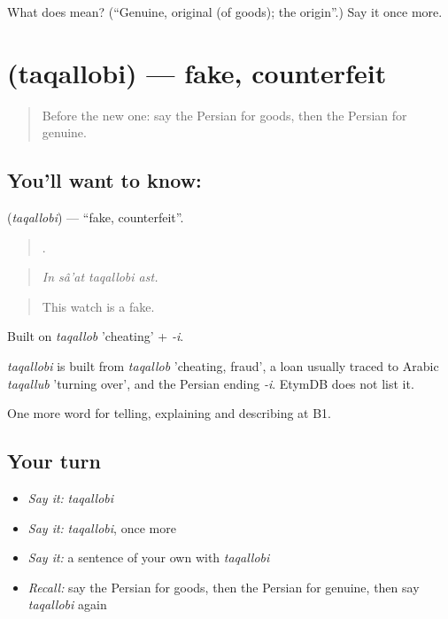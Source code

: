 \begin{tcolorbox}[breakable,colback=teal!4,colframe=teal!35!black,title={Before you move on}]
What does  mean? (\textquotedblleft{}Genuine, original (of goods); the origin\textquotedblright{}.) Say it once more.
\end{tcolorbox}
\section[\texorpdfstring{\fa{تقلبی} (taqallobi)}{تقلبی (taqallobi)}]{ (taqallobi) — fake, counterfeit}

\label{lesson:FA-C459-taqallobi}



\begin{quote}
Before the new one: say the Persian for goods, then the Persian for genuine.
\end{quote}

\subsection*{You'll want to know: }
\textbf{} (\emph{taqallobi}) — \textquotedblleft{}fake, counterfeit\textquotedblright{}.

\begin{quote}
   .
\end{quote}

\begin{quote}
\emph{In sâ'at taqallobi ast.}
\end{quote}

\begin{quote}
This watch is a fake.
\end{quote}

Built on \emph{taqallob} 'cheating' + \emph{-i}.

\begin{cousinweb}
\emph{taqallobi} is built from \emph{taqallob} 'cheating, fraud', a loan usually traced to Arabic \emph{taqallub} 'turning over', and the Persian ending \emph{-i}. EtymDB does not list it.
\end{cousinweb}

\begin{grammarlens}[title={What you've built}]
One more word for telling, explaining and describing at B1.
\end{grammarlens}

\subsection*{Your turn}
\begin{itemize}
\raggedright
  \item \emph{Say it:} \emph{taqallobi}
  \item \emph{Say it:} \emph{taqallobi}, once more
  \item \emph{Say it:} a sentence of your own with \emph{taqallobi}
  \item \emph{Recall:} say the Persian for goods, then the Persian for genuine, then say \emph{taqallobi} again
\end{itemize}

